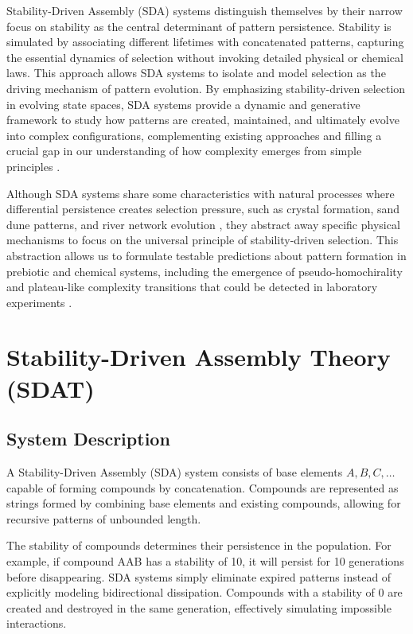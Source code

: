 \documentclass[preprint,12pt]{elsarticle}
\begin{document}
Stability-Driven Assembly (SDA) systems distinguish themselves by their narrow focus on stability as the central determinant of pattern persistence. Stability is simulated by associating different lifetimes with concatenated patterns, capturing the essential dynamics of selection without invoking detailed physical or chemical laws. This approach allows SDA systems to isolate and model selection as the driving mechanism of pattern evolution. By emphasizing stability-driven selection in evolving state spaces, SDA systems provide a dynamic and generative framework to study how patterns are created, maintained, and ultimately evolve into complex configurations, complementing existing approaches and filling a crucial gap in our understanding of how complexity emerges from simple principles \cite{lloyd2006programming, wolfram2020fundamental}.

Although SDA systems share some characteristics with natural processes where differential persistence creates selection pressure, such as crystal formation, sand dune patterns, and river network evolution \cite{ball1999self, kelso1997dynamic}, they abstract away specific physical mechanisms to focus on the universal principle of stability-driven selection. This abstraction allows us to formulate testable predictions about pattern formation in prebiotic and chemical systems, including the emergence of pseudo-homochirality and plateau-like complexity transitions that could be detected in laboratory experiments \cite{blackmond2010chiral, tononi2008phi}.


\section{Stability-Driven Assembly Theory (SDAT)}

\subsection{System Description}

A Stability-Driven Assembly (SDA) system consists of base elements \( A, B, C, \dots \) capable of forming compounds by concatenation. Compounds are represented as strings formed by combining base elements and existing compounds, allowing for recursive patterns of unbounded length.

The stability of compounds determines their persistence in the population. For example, if compound AAB has a stability of 10, it will persist for 10 generations before disappearing. SDA systems simply eliminate expired patterns instead of explicitly modeling bidirectional dissipation. Compounds with a stability of 0 are created and destroyed in the same generation, effectively simulating impossible interactions.
\end{document}

